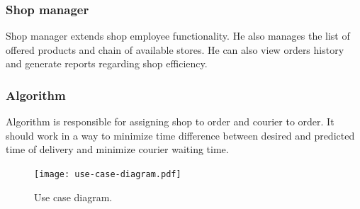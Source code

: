 \documentclass[../main.tex]{subfiles}
\begin{document}
\subsubsection{Shop manager}
Shop manager extends shop employee functionality. He also manages the list of offered products and chain of available stores. He can also view orders history and generate reports regarding shop efficiency.

\subsubsection{Algorithm}
Algorithm is responsible for assigning shop to order and courier to order. It should work in a way to minimize time difference between desired and predicted time of delivery and minimize courier waiting time.

\vspace{10mm}
\begin{figure}[h!]
\caption{Use case diagram.}
\vspace{5mm}
\centering
\texttt{[image: use-case-diagram.pdf]}
\end{figure}

\end{document}
